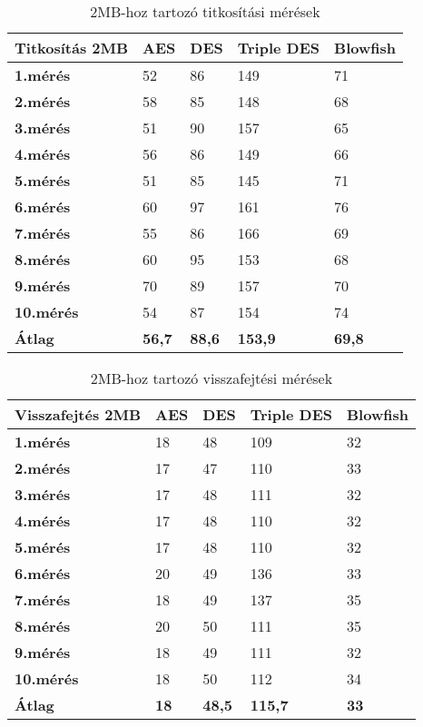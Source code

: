 \begin{table}[H]
	\centering
	\caption{2MB-hoz tartozó titkosítási mérések}
	\label{tab:enc_2mb}
	\medskip
	\begin{tabular}{|p{2.4cm}|p{2cm}|p{2cm}|p{2cm}|p{2cm}|}
		\hline
		\textbf{Titkosítás} \newline \textbf{2MB} & \textbf{AES} & \textbf{DES} & \textbf{Triple DES} & \textbf{Blowfish}\\
		\hline
		\textbf{1.mérés} & 52 & 86 & 149 & 71\\
		\hline
		\textbf{2.mérés} & 58 & 85 & 148 & 68\\
		\hline
		\textbf{3.mérés} & 51 & 90 & 157 & 65\\
		\hline
		\textbf{4.mérés} & 56 & 86 & 149 & 66\\
		\hline
		\textbf{5.mérés} & 51 & 85 & 145 & 71\\
		\hline
		\textbf{6.mérés} & 60 & 97 & 161 & 76\\
		\hline
		\textbf{7.mérés} & 55 & 86 & 166 & 69\\
		\hline
		\textbf{8.mérés} & 60 & 95 & 153 & 68\\
		\hline
		\textbf{9.mérés} & 70 & 89 & 157 & 70\\
		\hline
		\textbf{10.mérés} & 54 & 87 & 154 & 74\\
		\hline
		\hline
		\textbf{Átlag} & \textbf{56,7} & \textbf{88,6} & \textbf{153,9} & \textbf{69,8} \\
		\hline
	\end{tabular}
\end{table}

\begin{table}[H]
	\centering
	\caption{2MB-hoz tartozó visszafejtési mérések}
	\label{tab:dec_2mb}
	\medskip
	\begin{tabular}{|p{2.4cm}|p{2cm}|p{2cm}|p{2cm}|p{2cm}|}
		\hline
		\textbf{Visszafejtés} \newline \textbf{2MB} & \textbf{AES} & \textbf{DES} & \textbf{Triple DES} & \textbf{Blowfish}\\
		\hline
		\textbf{1.mérés} & 18 & 48 & 109 & 32\\
		\hline
		\textbf{2.mérés} & 17 & 47 & 110 & 33\\
		\hline
		\textbf{3.mérés} & 17 & 48 & 111 & 32\\
		\hline
		\textbf{4.mérés} & 17 & 48 & 110 & 32\\
		\hline
		\textbf{5.mérés} & 17 & 48 & 110 & 32\\
		\hline
		\textbf{6.mérés} & 20 & 49 & 136 & 33\\
		\hline
		\textbf{7.mérés} & 18 & 49 & 137 & 35\\
		\hline
		\textbf{8.mérés} & 20 & 50 & 111 & 35\\
		\hline
		\textbf{9.mérés} & 18 & 49 & 111 & 32\\
		\hline
		\textbf{10.mérés} & 18 & 50 & 112 & 34\\
		\hline
		\hline
		\textbf{Átlag} & \textbf{18} & \textbf{48,5} & \textbf{115,7} & \textbf{33}\\
		\hline
	\end{tabular}
\end{table}


